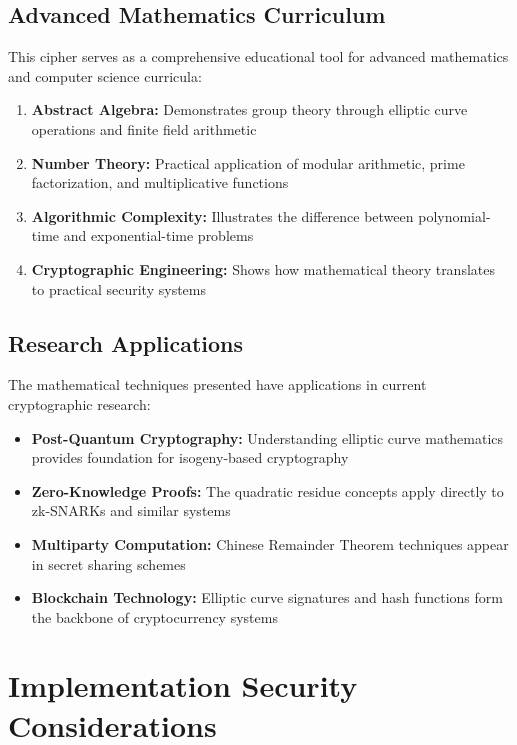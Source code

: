 \documentclass[12pt,a4paper]{article}
\begin{document}
\subsection{Advanced Mathematics Curriculum}

This cipher serves as a comprehensive educational tool for advanced mathematics and computer science curricula:

\begin{enumerate}
    \item \textbf{Abstract Algebra:} Demonstrates group theory through elliptic curve operations and finite field arithmetic
    \item \textbf{Number Theory:} Practical application of modular arithmetic, prime factorization, and multiplicative functions
    \item \textbf{Algorithmic Complexity:} Illustrates the difference between polynomial-time and exponential-time problems
    \item \textbf{Cryptographic Engineering:} Shows how mathematical theory translates to practical security systems
\end{enumerate}

\subsection{Research Applications}

The mathematical techniques presented have applications in current cryptographic research:

\begin{itemize}
    \item \textbf{Post-Quantum Cryptography:} Understanding elliptic curve mathematics provides foundation for isogeny-based cryptography
    \item \textbf{Zero-Knowledge Proofs:} The quadratic residue concepts apply directly to zk-SNARKs and similar systems
    \item \textbf{Multiparty Computation:} Chinese Remainder Theorem techniques appear in secret sharing schemes
    \item \textbf{Blockchain Technology:} Elliptic curve signatures and hash functions form the backbone of cryptocurrency systems
\end{itemize}

\section{Implementation Security Considerations}
\end{document}
